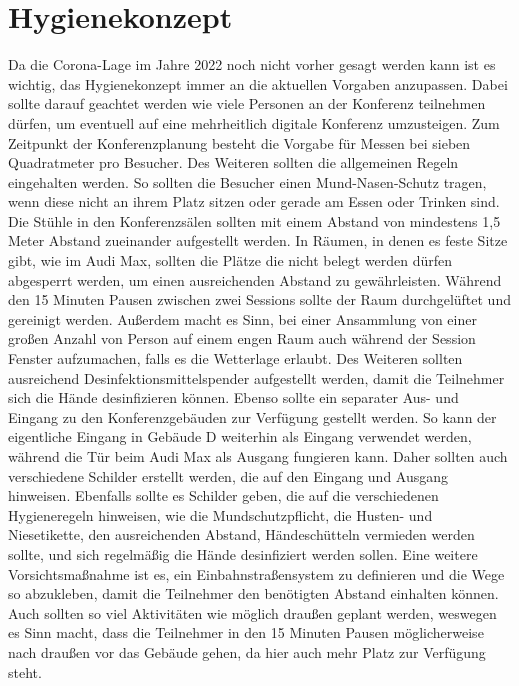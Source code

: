 \section{Hygienekonzept}
Da die Corona-Lage im Jahre 2022 noch nicht vorher gesagt werden kann ist es wichtig, das Hygienekonzept immer an die aktuellen Vorgaben anzupassen. Dabei sollte darauf geachtet werden wie viele Personen an der Konferenz teilnehmen dürfen, um eventuell auf eine mehrheitlich digitale Konferenz umzusteigen. Zum Zeitpunkt der Konferenzplanung besteht die Vorgabe für Messen bei sieben Quadratmeter pro Besucher. Des Weiteren sollten die allgemeinen Regeln eingehalten werden. So sollten die Besucher einen Mund-Nasen-Schutz tragen, wenn diese nicht an ihrem Platz sitzen oder gerade am Essen oder Trinken sind. Die Stühle in den Konferenzsälen sollten mit einem Abstand von mindestens 1,5 Meter Abstand zueinander aufgestellt werden. In Räumen, in denen es feste Sitze gibt, wie im Audi Max, sollten die Plätze die nicht belegt werden dürfen abgesperrt werden, um einen ausreichenden Abstand zu gewährleisten. Während den 15 Minuten Pausen zwischen zwei Sessions sollte der Raum durchgelüftet und gereinigt werden. Außerdem macht es Sinn, bei einer Ansammlung von einer großen Anzahl von Person auf einem engen Raum auch während der Session Fenster aufzumachen, falls es die Wetterlage erlaubt. Des Weiteren sollten ausreichend Desinfektionsmittelspender aufgestellt werden, damit die Teilnehmer sich die Hände desinfizieren können. Ebenso sollte ein separater Aus- und Eingang zu den Konferenzgebäuden zur Verfügung gestellt werden. So kann der eigentliche Eingang in Gebäude D weiterhin als Eingang verwendet werden, während die Tür beim Audi Max als Ausgang fungieren kann. Daher sollten auch verschiedene Schilder erstellt werden, die auf den Eingang und Ausgang hinweisen. Ebenfalls sollte es Schilder geben, die auf die verschiedenen Hygieneregeln hinweisen, wie die Mundschutzpflicht, die Husten- und Niesetikette, den ausreichenden Abstand, Händeschütteln vermieden werden sollte, und sich regelmäßig die Hände desinfiziert werden sollen. Eine weitere Vorsichtsmaßnahme ist es, ein Einbahnstraßensystem zu definieren und die Wege so abzukleben, damit die Teilnehmer den benötigten Abstand einhalten können. Auch sollten so viel Aktivitäten wie möglich draußen geplant werden, weswegen es Sinn macht, dass die Teilnehmer in den 15 Minuten Pausen möglicherweise nach draußen vor das Gebäude gehen, da hier auch mehr Platz zur Verfügung steht. 

